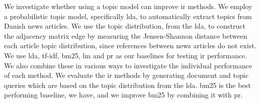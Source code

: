 We investigate whether using a topic model can improve \gls{ir} methods.
We employ a probabilistic topic model, specifically \gls{lda}, to automatically extract topics from Danish news articles.
We use the topic distribution, from the \gls{lda}, to construct the adjacency matrix edge by measuring the Jensen-Shannon distance between each article topic distribution, since references between news articles do not exist.
We use \gls{lda}, \gls{tf-idf}, \gls{bm25}, \gls{lm} and \gls{pr} as our baselines for testing \gls{ir} performance.
We also combine these in various ways to investigate the individual performance of each method.
We evaluate the \gls{ir} methods by generating document and topic queries which are based on the topic distribution from the \gls{lda}.
\gls{bm25} is the best performing baseline, we have, and we improve \gls{bm25} by combining it with \gls{pr}.